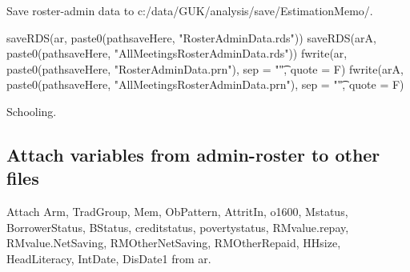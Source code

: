 Save roster-admin data to \textsf{\footnotesize c:/data/GUK/analysis/save/EstimationMemo/}.
\begin{Schunk}
\begin{Sinput}
saveRDS(ar, paste0(pathsaveHere, "RosterAdminData.rds"))
saveRDS(arA, paste0(pathsaveHere, "AllMeetingsRosterAdminData.rds"))
fwrite(ar, paste0(pathsaveHere, "RosterAdminData.prn"), sep = "\t", quote = F)
fwrite(arA, paste0(pathsaveHere, "AllMeetingsRosterAdminData.prn"), sep = "\t", quote = F)
\end{Sinput}
\end{Schunk}

Schooling. \gobblepars








\subsection{Attach variables from admin-roster to other files}


Attach \textsf{Arm, TradGroup, Mem, ObPattern, AttritIn, o1600, Mstatus, BorrowerStatus, BStatus, creditstatus, povertystatus, RMvalue.repay, RMvalue.NetSaving, RMOtherNetSaving, RMOtherRepaid, HHsize, HeadLiteracy, IntDate, DisDate1} from \textsf{ar}.

